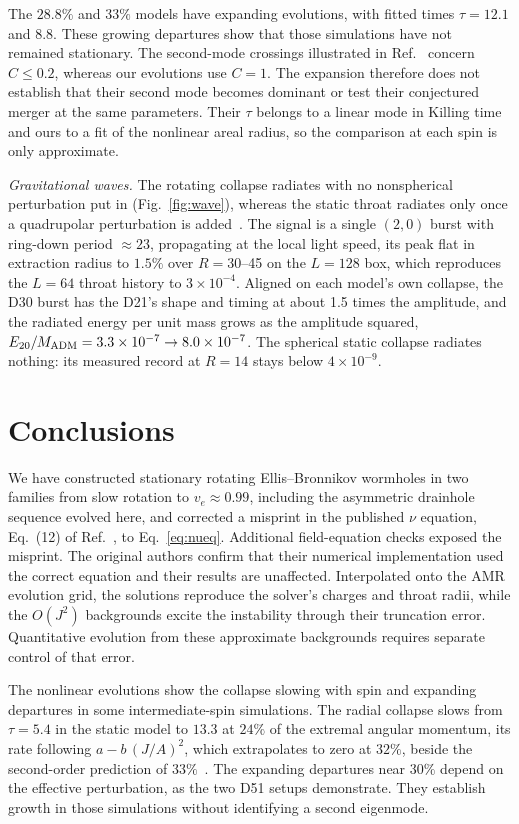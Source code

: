 \documentclass[twocolumn,floatfix,aps,prd,superscriptaddress,nofootinbib]{revtex4-2}
\begin{document}
The $28.8\%$ and $33\%$ models have expanding evolutions, with fitted times $\tau=12.1$ and 8.8. These growing departures show that those simulations have not remained stationary. The second-mode crossings illustrated in Ref.~\cite{azad2024} concern $C\le0.2$, whereas our evolutions use $C=1$. The expansion therefore does not establish that their second mode becomes dominant or test their conjectured merger at the same parameters. Their $\tau$ belongs to a linear mode in Killing time and ours to a fit of the nonlinear areal radius, so the comparison at each spin is only approximate.

\emph{Gravitational waves.} The rotating collapse radiates with no nonspherical perturbation put in (Fig.~\ref{fig:wave}), whereas the static throat radiates only once a quadrupolar perturbation is added~\cite{shirokov2026c}. The signal is a single $(2,0)$ burst with ring-down period ${\approx}23$, propagating at the local light speed, its peak flat in extraction radius to $1.5\%$ over $R=30$--45 on the $L=128$ box, which reproduces the $L=64$ throat history to $3\times10^{-4}$. Aligned on each model's own collapse, the D30 burst has the D21's shape and timing at about 1.5 times the amplitude, and the radiated energy per unit mass grows as the amplitude squared, $E_{20}/M_{\rm ADM}=3.3\times10^{-7}\to8.0\times10^{-7}$. The spherical static collapse radiates nothing: its measured record at $R=14$ stays below $4\times10^{-9}$.

\section{Conclusions}
\label{sec:conclusions}

We have constructed stationary rotating Ellis--Bronnikov wormholes in two families from slow rotation to $v_e\approx0.99$, including the asymmetric drainhole sequence evolved here, and corrected a misprint in the published $\nu$ equation, Eq.~(12) of Ref.~\cite{chew2016}, to Eq.~\eqref{eq:nueq}. Additional field-equation checks exposed the misprint. The original authors confirm that their numerical implementation used the correct equation and their results are unaffected. Interpolated onto the AMR evolution grid, the solutions reproduce the solver's charges and throat radii, while the $O(J^2)$ backgrounds excite the instability through their truncation error. Quantitative evolution from these approximate backgrounds requires separate control of that error.

The nonlinear evolutions show the collapse slowing with spin and expanding departures in some intermediate-spin simulations. The radial collapse slows from $\tau=5.4$ in the static model to $13.3$ at $24\%$ of the extremal angular momentum, its rate following $a-b\,(J/A)^2$, which extrapolates to zero at $32\%$, beside the second-order prediction of $33\%$~\cite{azad2023,azad2024}. The expanding departures near $30\%$ depend on the effective perturbation, as the two D51 setups demonstrate. They establish growth in those simulations without identifying a second eigenmode.
\end{document}
